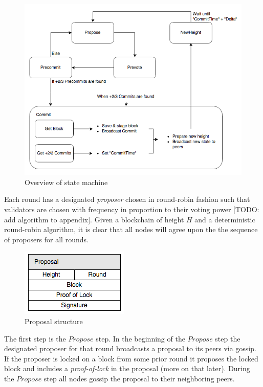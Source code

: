 \documentclass[letter,11pt]{article}
\begin{document}
\begin{figure}[H]
 \centering
 \includegraphics[scale=0.5]{figures/statemachine.png}
 \caption{Overview of state machine}
\end{figure}

Each round has a designated \textit{proposer} chosen in round-robin fashion such that validators are chosen with frequency in proportion to their voting power [TODO: add algorithm to appendix].  Given a blockchain of height $H$ and a deterministic round-robin algorithm, it is clear that all nodes will agree upon the the sequence of proposers for all rounds.

\begin{figure}[H]
 \centering
 \includegraphics[scale=0.5]{figures/proposal.png}
 \caption{Proposal structure}
\end{figure}

The first step is the $Propose$ step.  In the beginning of the $Propose$ step the designated proposer for that round broadcasts a proposal to its peers via gossip.  If the proposer is locked on a block from some prior round it proposes the locked block and includes a \textit{proof-of-lock} in the proposal (more on that later).  During the $Propose$ step all nodes gossip the proposal to their neighboring peers.\\
\end{document}
